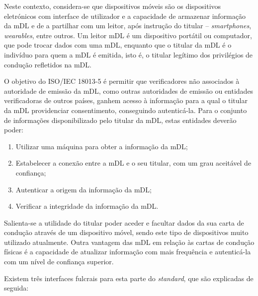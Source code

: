 Neste contexto, considera-se que dispositivos móveis são os dispositivos eletrónicos com interface de utilizador e a capacidade de armazenar informação da mDL e de a partilhar com um leitor, após instrução do titular -- \textit{smartphones}, \textit{wearables}, entre outros. Um leitor mDL é um dispositivo portátil ou computador, que pode trocar dados com uma mDL, enquanto que o titular da mDL é o indivíduo para quem a mDL é emitida, isto é, o titular legítimo dos privilégios de condução refletidos na mDL.

O objetivo do ISO/IEC 18013-5 é permitir que verificadores não associados à autoridade de emissão da mDL, como outras autoridades de emissão ou entidades verificadoras de outros países, ganhem acesso à informação para a qual o titular da mDL providenciar consentimento, conseguindo autenticá-la. Para o conjunto de informações disponibilizado pelo titular da mDL, estas entidades deverão poder:

\begin{enumerate}
	\item Utilizar uma máquina para obter a informação da mDL;
	\item Estabelecer a conexão entre a mDL e o seu titular, com um grau aceitável de confiança;
	\item Autenticar a origem da informação da mDL;
	\item Verificar a integridade da informação da mDL.
\end{enumerate}

Salienta-se a utilidade do titular poder aceder e facultar dados da sua carta de condução através de um dispositivo móvel, sendo este tipo de dispositivos muito utilizado atualmente. Outra vantagem das mDL em relação às cartas de condução físicas é a capacidade de atualizar informação com mais frequência e autenticá-la com um nível de confiança superior.

Existem três interfaces fulcrais para esta parte do \textit{standard}, que são explicadas de seguida:

